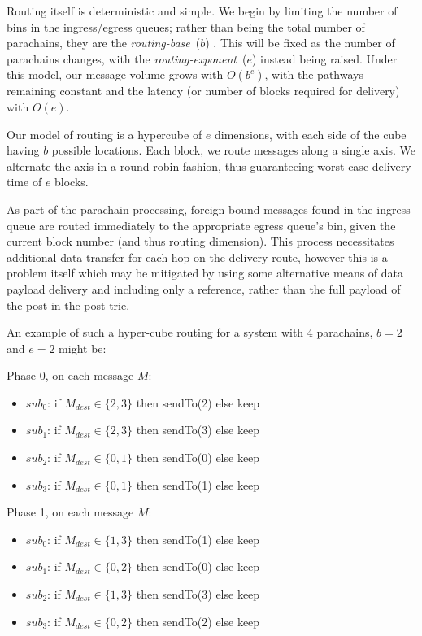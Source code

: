 \documentclass[9pt,oneside]{amsart}
\providecommand{\tightlist}{%
  \setlength{\itemsep}{0pt}\setlength{\parskip}{0pt}}
\begin{document}
\begin{multicols}{2}
 Routing itself is deterministic and simple. We begin by limiting the number of bins in the ingress/egress queues; rather than being the total number of parachains, they are the \emph{routing-base}~($b$) . This will be fixed as the number of parachains changes, with the \emph{routing-exponent}~($e$) instead being raised. Under this model, our message volume grows with $O(b^e)$, with the pathways remaining constant and the latency (or number of blocks required for delivery) with $O(e)$.

 Our model of routing is a hypercube of $e$ dimensions, with each side of the cube having $b$ possible locations. Each block, we route messages along a single axis. We alternate the axis in a round-robin fashion, thus guaranteeing worst-case delivery time of $e$ blocks.
 

 As part of the parachain processing, foreign-bound messages found in the ingress queue are routed immediately to the appropriate egress queue's bin, given the current block number (and thus routing dimension). This process necessitates additional data transfer for each hop on the delivery route, however this is a problem itself which may be mitigated by using some alternative means of data payload delivery and including only a reference, rather than the full payload of the post in the post-trie.

 An example of such a hyper-cube routing for a system with 4 parachains, $b=2$ and $e=2$ might be:

 Phase 0, on each message $M$:

\begin{itemize}
\tightlist
\item $sub_0$: if $M_{dest} \in \{ 2, 3 \}$ then sendTo(2) else keep
\item $sub_1$: if $M_{dest} \in \{ 2, 3 \}$ then sendTo(3) else keep
\item $sub_2$: if $M_{dest} \in \{ 0, 1 \}$ then sendTo(0) else keep
\item $sub_3$: if $M_{dest} \in \{ 0, 1 \}$ then sendTo(1) else keep
\end{itemize}

 Phase 1, on each message $M$:

\begin{itemize}
\tightlist
\item $sub_0$: if $M_{dest} \in \{ 1, 3 \}$ then sendTo(1) else keep
\item $sub_1$: if $M_{dest} \in \{ 0, 2 \}$ then sendTo(0) else keep
\item $sub_2$: if $M_{dest} \in \{ 1, 3 \}$ then sendTo(3) else keep
\item $sub_3$: if $M_{dest} \in \{ 0, 2 \}$ then sendTo(2) else keep
\end{itemize}


\end{multicols}
\end{document}
